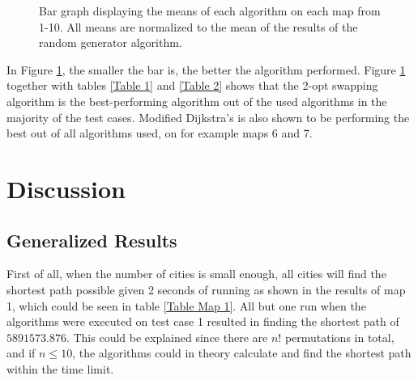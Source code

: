 \documentclass{article}
\begin{document}
\begin{figure}[H]
\caption{Bar graph displaying the means of each algorithm on each map from 1-10. All means are normalized to the mean of the results of the random generator algorithm.} \label{MeanDiagram}
\end{figure}

\noindent
In Figure \ref{MeanDiagram}, the smaller the bar is, the better the algorithm performed. Figure \ref{MeanDiagram} together with tables \ref{Table 1} and \ref{Table 2} shows that the 2-opt swapping algorithm is the best-performing algorithm out of the used algorithms in the majority of the test cases. Modified Dijkstra's is also shown to be performing the best out of all algorithms used, on for example maps 6 and 7. 


\section{Discussion}\label{sec4}

\subsection{Generalized Results}\label{subsec1}
First of all, when the number of cities is small enough, all cities will find the shortest path possible given 2 seconds of running as shown in the results of map 1, which could be seen in table \ref{Table Map 1}. All but one run when the algorithms were executed on test case 1 resulted in finding the shortest path of $5891573.876$. This could be explained since there are $n!$ permutations in total, and if $n\leq 10$, the algorithms could in theory calculate and find the shortest path within the time limit.
\end{document}
